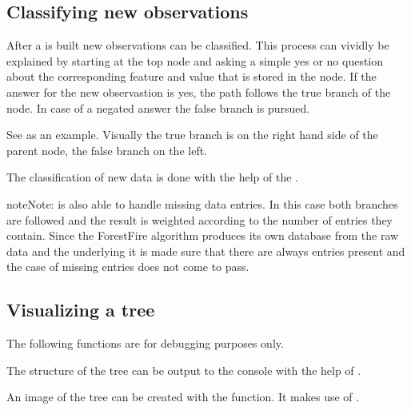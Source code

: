 \documentclass[letterpaper,10pt,english]{sphinxmanual}
\begin{document}
\subsection{Classifying new observations}
\label{\detokenize{DT:classifying-new-observations}}
After a {\hyperref[\detokenize{Overview:term-decision-tree}]{}} is built new observations can be classified.
This process can vividly be explained by starting at the top node and asking a simple yes or no question about the corresponding feature and value that is stored in the node.
If the answer for the new observastion is yes, the path follows the true branch of the node.
In case of a negated answer the false branch is pursued.

See {\hyperref[\detokenize{DT:treeview}]{}} as an example. Visually the true branch is on the right hand side of the parent node, the false branch on the left.

The classification of new data is done with the help of the {\hyperref[\detokenize{DT:classify}]{}}.

\begin{sphinxadmonition}{note}{Note:}
{\hyperref[\detokenize{DT:classify}]{}} is also able to handle missing data entries.
In this case both branches are followed and the result is weighted according to the number of entries they contain.
Since the ForestFire algorithm produces its own database from the raw data and the underlying {\hyperref[\detokenize{Overview:mla}]{}} it is made sure that there are always entries present and the case of missing entries does not come to pass.
\end{sphinxadmonition}


\subsection{Visualizing a tree}
\label{\detokenize{DT:visualizing-a-tree}}
The following functions are for debugging purposes only.

The structure of the tree can be output to the console with the help of {\hyperref[\detokenize{DT:printtree}]{}}.

An image of the tree can be created with the {\hyperref[\detokenize{DT:drawtree}]{}} function.
It makes use of {\hyperref[\detokenize{DT:drawnode}]{}}.
\end{document}
